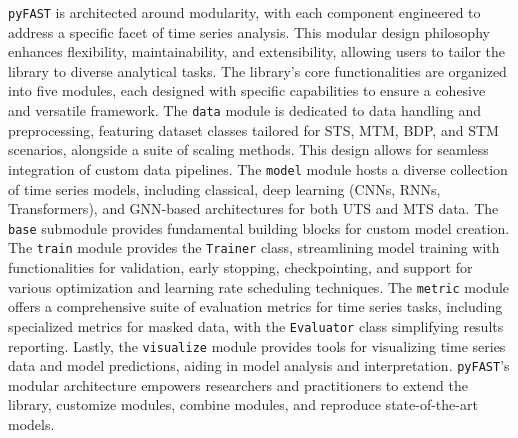 \documentclass{article}
\begin{document}
\texttt{pyFAST} is architected around modularity, with each component engineered to address a specific facet of time series analysis. This modular design philosophy enhances flexibility, maintainability, and extensibility, allowing users to tailor the library to diverse analytical tasks. The library’s core functionalities are organized into five modules, each designed with specific capabilities to ensure a cohesive and versatile framework. The \texttt{data} module is dedicated to data handling and preprocessing, featuring dataset classes tailored for STS, MTM, BDP, and STM scenarios, alongside a suite of scaling methods. This design allows for seamless integration of custom data pipelines.  The \texttt{model} module hosts a diverse collection of time series models, including classical, deep learning (CNNs, RNNs, Transformers), and GNN-based architectures for both UTS and MTS data. The \texttt{base} submodule provides fundamental building blocks for custom model creation.  The \texttt{train} module provides the \texttt{Trainer} class, streamlining model training with functionalities for validation, early stopping, checkpointing, and support for various optimization and learning rate scheduling techniques. The \texttt{metric} module offers a comprehensive suite of evaluation metrics for time series tasks, including specialized metrics for masked data, with the \texttt{Evaluator} class simplifying results reporting.  Lastly, the \texttt{visualize} module provides tools for visualizing time series data and model predictions, aiding in model analysis and interpretation. \texttt{pyFAST}'s modular architecture empowers researchers and practitioners to extend the library, customize modules, combine modules, and reproduce state-of-the-art models.
\end{document}
